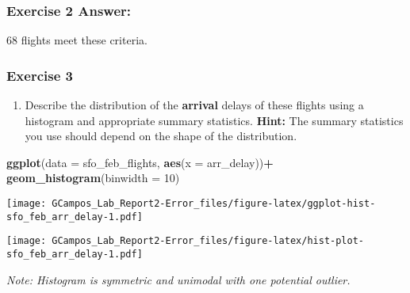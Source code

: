 \documentclass[
]{article}
\newenvironment{Shaded}{\begin{snugshade}}{\end{snugshade}}
\newcommand{\CommentTok}[1]{\textcolor[rgb]{0.56,0.35,0.01}{\textit{#1}}}
\newcommand{\DataTypeTok}[1]{\textcolor[rgb]{0.13,0.29,0.53}{#1}}
\newcommand{\DecValTok}[1]{\textcolor[rgb]{0.00,0.00,0.81}{#1}}
\newcommand{\KeywordTok}[1]{\textcolor[rgb]{0.13,0.29,0.53}{\textbf{#1}}}
\newcommand{\NormalTok}[1]{#1}
\newcommand{\OperatorTok}[1]{\textcolor[rgb]{0.81,0.36,0.00}{\textbf{#1}}}
\newcommand{\StringTok}[1]{\textcolor[rgb]{0.31,0.60,0.02}{#1}}
\providecommand{\tightlist}{%
  \setlength{\itemsep}{0pt}\setlength{\parskip}{0pt}}
\begin{document}
\hypertarget{exercise-2-answer}{%
\subsubsection{\texorpdfstring{\textbf{Exercise 2
Answer:}}{Exercise 2 Answer:}}\label{exercise-2-answer}}

68 flights meet these criteria.\newline

\hypertarget{exercise-3}{%
\subsubsection{Exercise 3}\label{exercise-3}}

\begin{enumerate}
\def\labelenumi{\arabic{enumi}.}
\setcounter{enumi}{2}
\tightlist
\item
  Describe the distribution of the \textbf{arrival} delays of these
  flights using a histogram and appropriate summary statistics.
  \textbf{Hint:} The summary statistics you use should depend on the
  shape of the distribution.
\end{enumerate}

\begin{Shaded}
\begin{Highlighting}[]
\KeywordTok{ggplot}\NormalTok{(}\DataTypeTok{data =}\NormalTok{ sfo_feb_flights, }\KeywordTok{aes}\NormalTok{(}\DataTypeTok{x =}\NormalTok{ arr_delay))}\OperatorTok{+}
\StringTok{    }\KeywordTok{geom_histogram}\NormalTok{(}\DataTypeTok{binwidth =} \DecValTok{10}\NormalTok{)}
\end{Highlighting}
\end{Shaded}

\texttt{[image: GCampos\_Lab\_Report2-Error\_files/figure-latex/ggplot-hist-sfo\_feb\_arr\_delay-1.pdf]}

\begin{Shaded}
\end{Shaded}

\texttt{[image: GCampos\_Lab\_Report2-Error\_files/figure-latex/hist-plot-sfo\_feb\_arr\_delay-1.pdf]}

\emph{Note: Histogram is symmetric and unimodal with one potential
outlier.}\newline \newline
\end{document}
